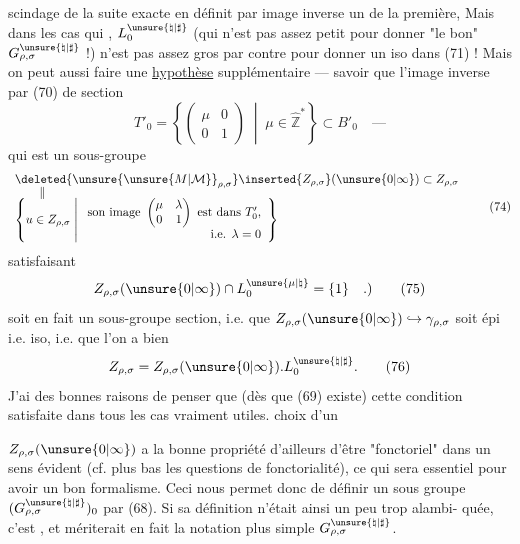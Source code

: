 scindage de la  suite exacte en définit par
image inverse un de la première, 
Mais dans les cas  qui ,
$L_0^{\unsure{\natural|\sharp}}$ (qui n'est pas assez petit pour donner
"le bon"  $G_{\rho,\sigma}^{\unsure{\natural|\sharp}}$ !)
n'est pas assez gros par contre pour donner un iso dans (71) !
Mais  on peut aussi faire une
\uline{hypothèse} supplémentaire --- savoir que l'image inverse par (70)
de  section
\[
T'_0=\left\{
\begin{pmatrix}\mu&0\\0&1\end{pmatrix}
\;\middle|\;\mu\in\widehat{\mathbb Z}^*
\right\}\subset B'_0
\quad\text{---}
\tag{73}
\]
qui est un sous-groupe
\[
\begin{array}{l}
\deleted{\unsure{\unsure{M|\mathcal{M}}}_{\rho,\sigma}}\inserted{Z_{\rho,\sigma}}
(\unsure{0|\infty})\subset Z_{\rho,\sigma}\\[-2pt]
\qquad\Vert\\[-2pt]
\left\{
u\in Z_{\rho,\sigma}\;\middle|\;
\begin{array}{l}
\text{son image }
\begin{pmatrix}\mu&\lambda\\0&1\end{pmatrix}
\text{ est dans }T'_0,\\
\hfill\text{i.e. }\lambda=0
\end{array}
\right\}
\end{array}
\tag{74}
\]
satisfaisant
\[
Z_{\rho,\sigma}(\unsure{0|\infty})\cap L_0^{\unsure{\mu|\natural}}
=\{1\}\quad.)
\tag{75}
\]
soit en fait un sous-groupe section,
i.e. que $Z_{\rho,\sigma}(\unsure{0|\infty})\hookrightarrow\gamma_{\rho,\sigma}$
soit épi i.e. iso, i.e. que l'on a bien
\[
Z_{\rho,\sigma}
=Z_{\rho,\sigma}(\unsure{0|\infty}).L_0^{\unsure{\natural|\sharp}}.
\tag{76}
\]
J'ai des bonnes raisons de penser que (dès que (69) existe)
cette condition  satisfaite dans tous les cas vraiment utiles.
 choix d'un



$Z_{\rho,\sigma}(\unsure{0|\infty})$ a la bonne propriété d'ailleurs d'être
"fonctoriel" dans un sens évident (cf. plus bas les questions de fonctorialité),
ce qui sera essentiel pour avoir un bon formalisme. Ceci nous permet donc
de définir un sous groupe
$(G_{\rho,\sigma}^{\unsure{\natural|\sharp}})_0$
par (68). Si sa définition n'était ainsi un peu trop alambi-\linebreak
quée, c'est
,
et mériterait en fait la notation plus simple
$G_{\rho,\sigma}^{\unsure{\natural|\sharp}}$.

